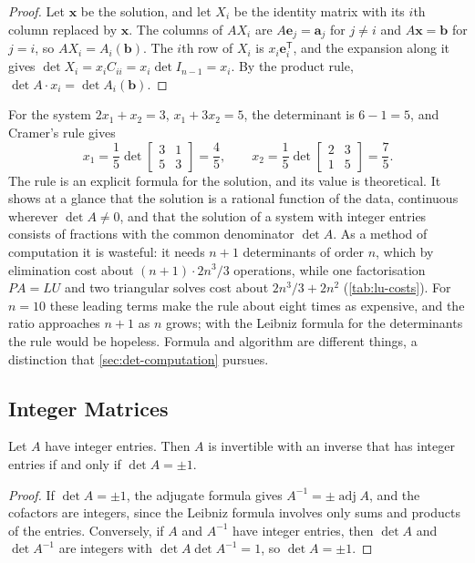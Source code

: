 \begin{proof}
Let $\mathbf x$ be the solution, and let $X_i$ be the identity matrix with its $i$th column replaced by $\mathbf x$. The columns of $AX_i$ are $A\mathbf e_j=\mathbf a_j$ for $j\ne i$ and $A\mathbf x=\mathbf b$ for $j=i$, so $AX_i=A_i(\mathbf b)$. The $i$th row of $X_i$ is $x_i\mathbf e_i^{\mathsf T}$, and the expansion along it gives $\det X_i=x_iC_{ii}=x_i\det I_{n-1}=x_i$. By the product rule, $\det A\cdot x_i=\det A_i(\mathbf b)$.
\end{proof}

For the system $2x_1+x_2=3$, $x_1+3x_2=5$, the determinant is $6-1=5$, and Cramer's rule gives
\[
x_1=\frac15\det\begin{bmatrix}3&1\\5&3\end{bmatrix}=\frac45,\qquad x_2=\frac15\det\begin{bmatrix}2&3\\1&5\end{bmatrix}=\frac75 .
\]
The rule is an explicit formula for the solution, and its value is theoretical. It shows at a glance that the solution is a rational function of the data, continuous wherever $\det A\ne0$, and that the solution of a system with integer entries consists of fractions with the common denominator $\det A$. As a method of computation it is wasteful: it needs $n+1$ determinants of order $n$, which by elimination cost about $(n+1)\cdot2n^3/3$ operations, while one factorisation $PA=LU$ and two triangular solves cost about $2n^3/3+2n^2$ (\cref{tab:lu-costs}). For $n=10$ these leading terms make the rule about eight times as expensive, and the ratio approaches $n+1$ as $n$ grows; with the Leibniz formula for the determinants the rule would be hopeless. Formula and algorithm are different things, a distinction that \cref{sec:det-computation} pursues.

\subsection{Integer Matrices}

\begin{proposition}
\label{prop:unimodular}
Let $A$ have integer entries. Then $A$ is invertible with an inverse that has integer entries if and only if $\det A=\pm1$.
\end{proposition}

\begin{proof}
If $\det A=\pm1$, the adjugate formula gives $A^{-1}=\pm\operatorname{adj}A$, and the cofactors are integers, since the Leibniz formula involves only sums and products of the entries. Conversely, if $A$ and $A^{-1}$ have integer entries, then $\det A$ and $\det A^{-1}$ are integers with $\det A\det A^{-1}=1$, so $\det A=\pm1$.
\end{proof}


